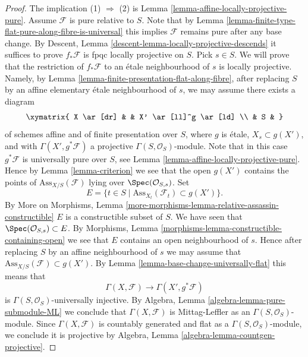 \begin{proof}
The implication (1) $\Rightarrow$ (2) is
Lemma \ref{lemma-affine-locally-projective-pure}.
Assume $\mathcal{F}$ is pure relative to $S$.
Note that by
Lemma \ref{lemma-finite-type-flat-pure-along-fibre-is-universal}
this implies $\mathcal{F}$ remains pure after any base change. By
Descent, Lemma \ref{descent-lemma-locally-projective-descends}
it suffices to prove $f_*\mathcal{F}$ is fpqc locally projective on $S$.
Pick $s \in S$. We will prove that the restriction of
$f_*\mathcal{F}$ to an \'etale neighbourhood of $s$ is locally projective.
Namely, by
Lemma \ref{lemma-finite-presentation-flat-along-fibre},
after replacing $S$ by an affine elementary \'etale
neighbourhood of $s$, we may assume there exists a diagram
$$
\xymatrix{
X \ar[dr] & & X' \ar[ll]^g \ar[ld] \\
& S &
}
$$
of schemes affine and of finite presentation over $S$,
where $g$ is \'etale, $X_s \subset g(X')$, and with
$\Gamma(X', g^*\mathcal{F})$ a projective $\Gamma(S, \mathcal{O}_S)$-module.
Note that in this case $g^*\mathcal{F}$ is universally pure over $S$, see
Lemma \ref{lemma-affine-locally-projective-pure}.
Hence by
Lemma \ref{lemma-criterion}
we see that the open $g(X')$ contains the points of
$\text{Ass}_{X/S}(\mathcal{F})$ lying over $\Spec(\mathcal{O}_{S, s})$.
Set
$$
E = \{t \in S \mid \text{Ass}_{X_t}(\mathcal{F}_t) \subset g(X') \}.
$$
By
More on Morphisms,
Lemma \ref{more-morphisms-lemma-relative-assassin-constructible}
$E$ is a constructible subset of $S$. We have seen that
$\Spec(\mathcal{O}_{S, s}) \subset E$. By
Morphisms, Lemma \ref{morphisms-lemma-constructible-containing-open}
we see that $E$ contains an open neighbourhood of $s$. Hence after
replacing $S$ by an affine neighbourhood of $s$ we may assume that
$\text{Ass}_{X/S}(\mathcal{F}) \subset g(X')$.
By
Lemma \ref{lemma-base-change-universally-flat}
this means that
$$
\Gamma(X, \mathcal{F}) \longrightarrow \Gamma(X', g^*\mathcal{F})
$$
is $\Gamma(S, \mathcal{O}_S)$-universally injective.
By Algebra, Lemma \ref{algebra-lemma-pure-submodule-ML}
we conclude that $\Gamma(X, \mathcal{F})$ is Mittag-Leffler as an
$\Gamma(S, \mathcal{O}_S)$-module. Since
$\Gamma(X, \mathcal{F})$ is countably generated and flat as a
$\Gamma(S, \mathcal{O}_S)$-module, we conclude
it is projective by
Algebra, Lemma \ref{algebra-lemma-countgen-projective}.
\end{proof}
